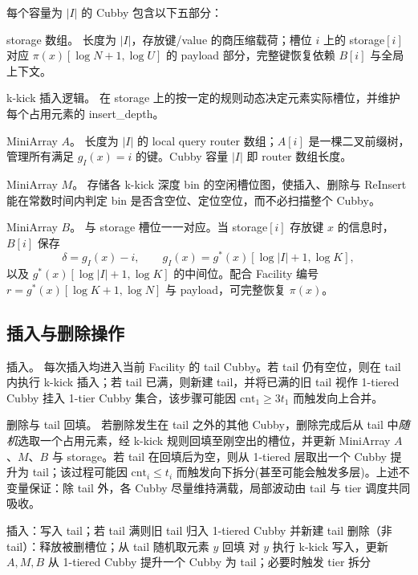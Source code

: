 每个容量为 \(|I|\) 的 Cubby 包含以下五部分：

storage 数组。 长度为 \(|I|\)，存放键/value 的商压缩载荷；槽位 \(i\) 上的 storage\([i]\) 对应 \(\pi(x)[\log N+1,\log U]\) 的 payload 部分，完整键恢复依赖 \(B[i]\) 与全局上下文。

k-kick 插入逻辑。 在 storage 上的按一定的规则动态决定元素实际槽位，并维护每个占用元素的 insert\_depth。

MiniArray \(A\)。 长度为 \(|I|\) 的 local query router 数组；\(A[i]\) 是一棵二叉前缀树，管理所有满足 \(g_I(x)=i\) 的键。Cubby 容量 \(|I|\) 即 router 数组长度。

MiniArray \(M\)。 存储各 k-kick 深度 bin 的空闲槽位图，使插入、删除与 ReInsert 能在常数时间内判定 bin 是否含空位、定位空位，而不必扫描整个 Cubby。

MiniArray \(B\)。 与 storage 槽位一一对应。当 storage\([i]\) 存放键 \(x\) 的信息时，\(B[i]\) 保存
\[
  \delta=g_I(x)-i,\qquad g_I(x)=g^\ast(x)[\log|I|+1,\log K],
\]
以及 \(g^\ast(x)[\log|I|+1,\log K]\) 的中间位。配合 Facility 编号 \(r=g^\ast(x)[\log K+1,\log N]\) 与 payload，可完整恢复 \(\pi(x)\)\cite{bender2022otsh,pagh2008retrieval}。

\subsection{插入与删除操作}

插入。 每次插入均进入当前 Facility 的 tail Cubby。若 tail 仍有空位，则在 tail 内执行 k-kick 插入；若 tail 已满，则新建 tail，并将已满的旧 tail 视作 1-tiered Cubby 挂入 1-tier Cubby 集合，该步骤可能因 \(\mathrm{cnt}_1\ge 3t_1\) 而触发向上合并。

删除与 tail 回填。 若删除发生在 tail 之外的其他 Cubby，删除完成后从 tail 中\emph{随机}选取一个占用元素，经 k-kick 规则回填至刚空出的槽位，并更新 MiniArray \(A\)、\(M\)、\(B\) 与 storage。若 tail 在回填后为空，则从 1-tiered 层取出一个 Cubby 提升为 tail；该过程可能因 \(\mathrm{cnt}_i\le t_i\) 而触发向下拆分(甚至可能会触发多层)。上述不变量保证：除 tail 外，各 Cubby 尽量维持满载，局部波动由 tail 与 tier 调度共同吸收\cite{bender2022otsh,aamand2021dynamic,bansal2022deletions}。

\begin{algorithm}[htbp]
  \caption{tail 维护与删除回填}
  \label{alg:tail-ops}
  \begin{algorithmic}[1]
    \State 插入：写入 tail；若 tail 满则旧 tail 归入 1-tiered Cubby 并新建 tail
    \State 删除（非 tail）：释放被删槽位；从 tail 随机取元素 \(y\) 回填
    \State 对 \(y\) 执行 k-kick 写入，更新 \(A,M,B\)
      \State 从 1-tiered Cubby 提升一个 Cubby 为 tail；必要时触发 tier 拆分
    \EndIf
  \end{algorithmic}
\end{algorithm}

